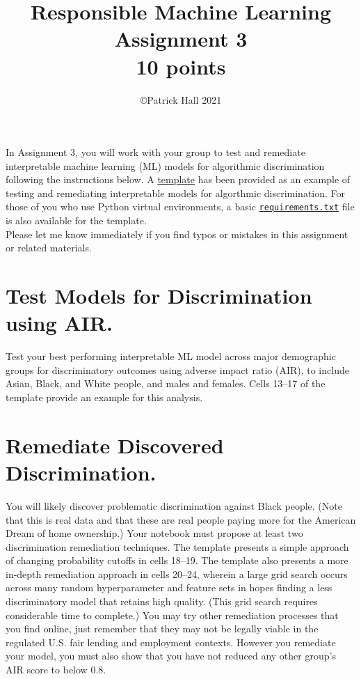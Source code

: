 \documentclass[fleqn]{article}
\title{Responsible Machine Learning\\\Large{Assignment 3}\\\Large{10 points}}
\author{\copyright Patrick Hall 2021}
\begin{document}
\maketitle

\noindent In Assignment 3, you will work with your group to test and remediate interpretable machine learning (ML) models for algorithmic discrimination following the instructions below. A \href{https://nbviewer.jupyter.org/github/jphall663/GWU_rml/blob/master/assignments/assignment_3/assign_3_template.ipynb?flush_cache=true}{template} has been provided as an example of testing and remediating interpretable models for algorthmic discrimination. For those of you who use Python virtual environments, a basic \href{https://github.com/jphall663/GWU_rml/blob/master/assignments/requirements.txt}{\texttt{requirements.txt}} file is also available for the template.\\

\noindent Please let me know immediately if you find typos or mistakes in this assignment or related materials. 

\section{Test Models for Discrimination using AIR.}

Test your best performing interpretable ML model across major demographic groups for discriminatory outcomes using adverse impact ratio (AIR), to include Asian, Black, and White people, and males and females. Cells 13--17 of the template provide an example for this analysis. 

\section{Remediate Discovered Discrimination.}

You will likely discover problematic discrimination against Black people. (Note that this is real data and that these are real people paying more for the American Dream of home ownership.) Your notebook must propose at least two discrimination remediation techniques. The template presents a simple approach of changing probability cutoffs in cells 18--19. The template also presents a more in-depth remediation approach in cells 20--24, wherein a large grid search occurs across many random hyperparameter and feature sets in hopes finding a less discriminatory model that retains high quality. (This grid search requires considerable time to complete.) You may try other remediation processes that you find online, just remember that they may not be legally viable in the regulated U.S. fair lending and employment contexts. However you remediate your model, you must also show that you have not reduced any other group's AIR score to below 0.8. 
\end{document}
